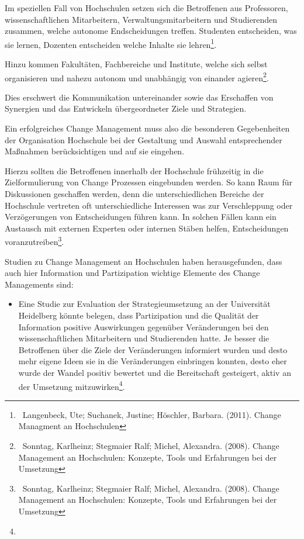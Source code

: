 \documentclass{article}
\begin{document}
Im speziellen Fall von Hochschulen setzen sich die Betroffenen aus Professoren, wissenschaftlichen Mitarbeitern,
Verwaltungsmitarbeitern und Studierenden zusammen, welche autonome Endscheidungen treffen. Studenten entscheiden, was
sie lernen, Dozenten entscheiden welche Inhalte sie lehren\footnote{\ Langenbeck, Ute; Suchanek, Justine; Höschler,
Barbara. (2011). Change Managment an Hochschulen}.


\bigskip

Hinzu kommen Fakultäten, Fachbereiche und Institute, welche sich selbst organisieren und nahezu autonom und unabhängig
von einander agieren\footnote{\ Sonntag, Karlheinz; Stegmaier Ralf; Michel, Alexandra. (2008). Change Management an
Hochschulen: Konzepte, Tools und Erfahrungen bei der Umsetzung}. 

Dies erschwert die Kommunikation untereinander sowie das Erschaffen von Synergien und das Entwickeln übergeordneter
Ziele und Strategien. \ \ \ 


\bigskip

Ein erfolgreiches Change Management muss also die besonderen Gegebenheiten der Organisation Hochschule bei der
Gestaltung und Auswahl entsprechender Maßnahmen berücksichtigen und auf sie eingehen. 


\bigskip

Hierzu sollten die Betroffenen innerhalb der Hochschule frühzeitig in die Zielformulierung von Change Prozessen
eingebunden werden. So kann Raum für Diskussionen geschaffen werden, denn die unterschiedlichen Bereiche der Hochschule
vertreten oft unterschiedliche Interessen was zur Verschleppung oder Verzögerungen von Entscheidungen führen kann. In
solchen Fällen kann ein Austausch mit externen Experten oder internen Stäben helfen, Entscheidungen
voranzutreiben\footnote{\ Sonntag, Karlheinz; Stegmaier Ralf; Michel, Alexandra. (2008). Change Management an
Hochschulen: Konzepte, Tools und Erfahrungen bei der Umsetzung}.

Studien zu Change Management an Hochschulen haben herausgefunden, dass auch hier Information und Partizipation wichtige
Elemente des Change Managements sind:


\bigskip

\begin{itemize}
\item Eine Studie zur Evaluation der Strategieumsetzung an der Universität Heidelberg könnte belegen, dass Partizipation
und die Qualität der Information positive Auswirkungen gegenüber Veränderungen bei den wissenschaftlichen Mitarbeitern
und Studierenden hatte. Je besser die Betroffenen über die Ziele der Veränderungen informiert wurden und desto mehr
eigene Ideen sie in die Veränderungen einbringen konnten, desto eher wurde der Wandel positiv bewertet und die
Bereitschaft gesteigert, aktiv an der Umsetzung mitzuwirken\footnote{}.
\end{itemize}
\end{document}
